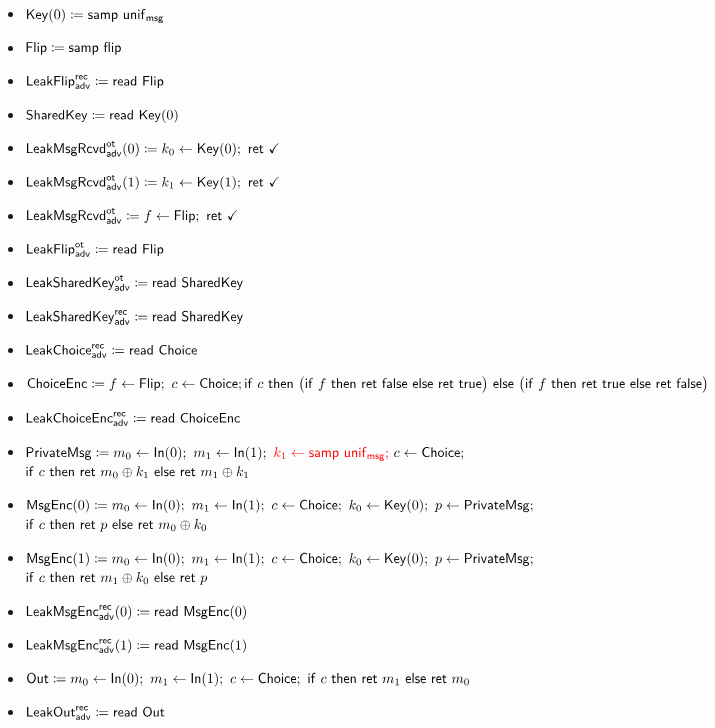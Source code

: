 \begin{itemize}
\item $\Key(0) \coloneqq \samp{\unif_\msg}$
\item $\Flip \coloneqq \samp{\flip}$
\item {\color{blue} $\LeakFlip^\rec_\adv \coloneqq \read{\Flip}$}
\item $\SharedKey \coloneqq \read{\Key(0)}$
\item {\color{blue} $\LeakKeyRcvd^\ot_\adv(0) \coloneqq k_0 \leftarrow \Key(0); \ \ret{\checkmark}$}
\item {\color{blue} $\LeakKeyRcvd^\ot_\adv(1) \coloneqq k_1 \leftarrow \Key(1); \ \ret{\checkmark}$}
\item {\color{blue} $\LeakFlipRcvd^\ot_\adv \coloneqq f \leftarrow \Flip; \ \ret{\checkmark}$}
\item {\color{blue} $\LeakFlip^\ot_\adv \coloneqq \read{\Flip}$}
\item {\color{blue} $\LeakSharedKey^\ot_\adv \coloneqq \read{\SharedKey}$}
\item {\color{blue} $\LeakSharedKey^\rec_\adv \coloneqq \read{\SharedKey}$}
\item {\color{blue} $\LeakChoice^\rec_\adv \coloneqq \read{\Choice}$}
\item $\ChoiceEnc \coloneqq f \leftarrow \Flip; \ c \leftarrow \Choice; \\ \ifte{c}{\big(\ifte{f}{\ret{\false}}{\ret{\true}}\big)}{\big(\ifte{f}{\ret{\true}}{\ret{\false}}\big)}$
\item {\color{blue} $\LeakChoiceEnc^\rec_\adv \coloneqq \read{\ChoiceEnc}$}
\item $\PrivateMsg \coloneqq m_0 \leftarrow \In(0); \ m_1 \leftarrow \In(1); \ {\color{red} k_1 \leftarrow \samp{\unif_\msg};} \ c \leftarrow \Choice;$ \\ $\ifte{c}{\ret{m_0 \oplus k_1}}{\ret{m_1 \oplus k_1}}$
\item $\MsgEnc(0) \coloneqq m_0 \leftarrow \In(0); \ m_1 \leftarrow \In(1); \ c \leftarrow \Choice; \ k_0 \leftarrow \Key(0); \ p \leftarrow \PrivateMsg;$ \\ $\ifte{c}{\ret{p}}{\ret{m_0 \oplus k_0}}$
\item $\MsgEnc(1) \coloneqq m_0 \leftarrow \In(0); \ m_1 \leftarrow \In(1); \ c \leftarrow \Choice; \ k_0 \leftarrow \Key(0); \ p \leftarrow \PrivateMsg;$ \\ $\ifte{c}{\ret{m_1 \oplus k_0}}{\ret{p}}$
\item {\color{blue} $\LeakMsgEnc^\rec_\adv(0) \coloneqq \read{\MsgEnc(0)}$}
\item {\color{blue} $\LeakMsgEnc^\rec_\adv(1) \coloneqq \read{\MsgEnc(1)}$}
\item $\Out \coloneqq m_0 \leftarrow \In(0); \ m_1 \leftarrow \In(1); \ c \leftarrow \Choice; \ \ifte{c}{\ret{m_1}}{\ret{m_0}}$
\item {\color{blue} $\LeakOut^\rec_\adv \coloneqq \read{\Out}$}
\end{itemize}

